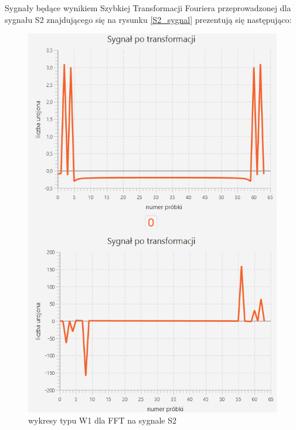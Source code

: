 \documentclass[12pt]{article}
\begin{document}
Sygnały będące wynikiem Szybkiej Transformacji Fouriera przeprowadzonej dla sygnału S2 znajdującego się na rysunku \ref{S2_sygnal} prezentują się następująco:
\begin{figure}[H]
	\centering
	\includegraphics[width=\linewidth]{S2_FFT_W1.png}
	\caption{wykresy typu W1 dla FFT na sygnale S2}
	\label{S2_FFT_W1}
\end{figure}
\end{document}
